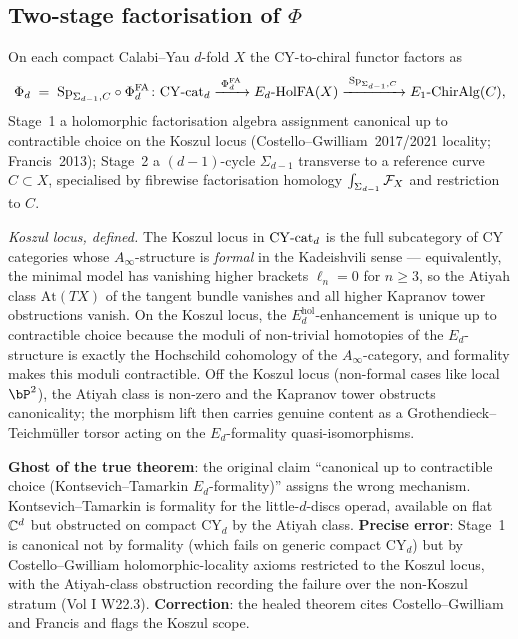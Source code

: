 \subsection{Two-stage factorisation of $\Phi$}
\label{wn:subsec:healed-two-stage}

\begin{theorem}\ClaimStatusHealed
\label{wn:thm:healed-two-stage}
On each compact Calabi--Yau $d$-fold $X$ the CY-to-chiral functor factors as
\[
\Phi_d \;=\; \mathrm{Sp}_{\Sigma_{d-1}, C} \circ \Phi^{\mathrm{FA}}_d
\colon \mathrm{CY}\text{-cat}_d \xrightarrow{\;\Phi^{\mathrm{FA}}_d\;} E_d\text{-}\mathrm{HolFA}(X)
\xrightarrow{\;\mathrm{Sp}_{\Sigma_{d-1}, C}\;} E_1\text{-}\mathrm{ChirAlg}(C),
\]
Stage~1 a holomorphic factorisation algebra assignment canonical up to contractible choice on the Koszul locus (Costello--Gwilliam~2017/2021 locality; Francis~2013); Stage~2 a $(d{-}1)$-cycle $\Sigma_{d-1}$ transverse to a reference curve $C \subset X$, specialised by fibrewise factorisation homology $\int_{\Sigma_{d-1}} \mathcal{F}_X$ and restriction to $C$.

\emph{Koszul locus, defined.} The Koszul locus in $\mathrm{CY}\text{-cat}_d$ is the
full subcategory of CY categories whose $A_\infty$-structure is
\emph{formal} in the Kadeishvili sense --- equivalently, the minimal
model has vanishing higher brackets $\ell_n = 0$ for $n \ge 3$, so
the Atiyah class $\mathrm{At}(TX)$ of the tangent bundle vanishes
and all higher Kapranov tower obstructions vanish. On the Koszul
locus, the $E_d^{\mathrm{hol}}$-enhancement is unique up to contractible
choice because the moduli of non-trivial homotopies of the
$E_d$-structure is exactly the Hochschild cohomology of the
$A_\infty$-category, and formality makes this moduli contractible.
Off the Koszul locus (non-formal cases like local $\bP^2$), the
Atiyah class is non-zero and the Kapranov tower obstructs
canonicality; the morphism lift then carries genuine content as a
Grothendieck--Teichm\"uller torsor acting on the $E_d$-formality
quasi-isomorphisms.
\end{theorem}

\textbf{Ghost of the true theorem}: the original claim ``canonical up to contractible choice (Kontsevich--Tamarkin $E_d$-formality)'' assigns the wrong mechanism. Kontsevich--Tamarkin is formality for the little-$d$-discs operad, available on flat $\mathbb{C}^d$ but obstructed on compact CY$_d$ by the Atiyah class. \textbf{Precise error}: Stage~1 is canonical not by formality (which fails on generic compact CY$_d$) but by Costello--Gwilliam holomorphic-locality axioms restricted to the Koszul locus, with the Atiyah-class obstruction recording the failure over the non-Koszul stratum (Vol I W22.3). \textbf{Correction}: the healed theorem cites Costello--Gwilliam and Francis and flags the Koszul scope.

